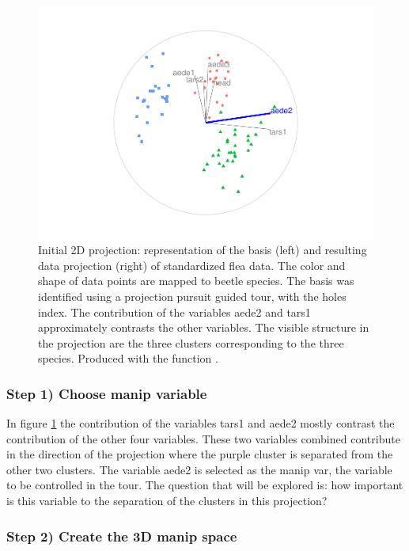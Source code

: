 \begin{Schunk}
\begin{figure}

{\centering \includegraphics[width=0.7\linewidth]{spyrison-cook_files/figure-latex/step0-1} 

}

\caption[Initial 2D projection]{Initial 2D projection: representation of the basis (left) and resulting data projection (right) of standardized flea data. The color and shape of data points are mapped to beetle species. The basis was identified using a projection pursuit guided tour, with the holes index. The contribution of the variables aede2 and tars1 approximately contrasts the other variables. The visible structure in the projection are the three clusters corresponding to the three species. Produced with the function .}\label{fig:step0}
\end{figure}
\end{Schunk}

\hypertarget{step-1-choose-manip-variable}{%
\subsubsection{Step 1) Choose manip
variable}\label{step-1-choose-manip-variable}}

In figure \ref{fig:step0} the contribution of the variables tars1 and
aede2 mostly contrast the contribution of the other four variables.
These two variables combined contribute in the direction of the
projection where the purple cluster is separated from the other two
clusters. The variable aede2 is selected as the manip var, the variable
to be controlled in the tour. The question that will be explored is: how
important is this variable to the separation of the clusters in this
projection?

\hypertarget{step-2-create-the-3d-manip-space}{%
\subsubsection{Step 2) Create the 3D manip
space}\label{step-2-create-the-3d-manip-space}}

